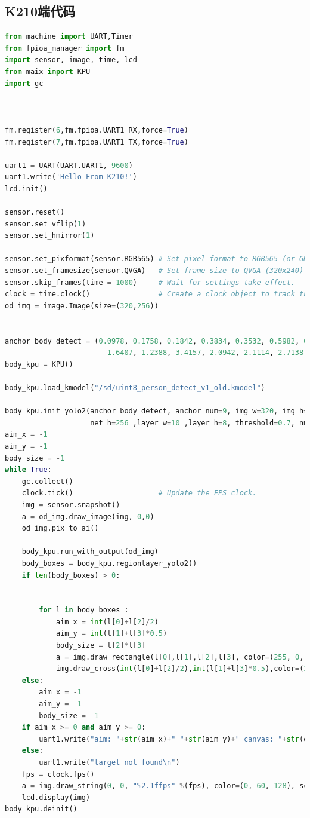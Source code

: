 \documentclass{article}
\begin{document}
\subsection{K210端代码}
\begin{lstlisting}[language=python,caption=main.py]
from machine import UART,Timer
from fpioa_manager import fm
import sensor, image, time, lcd
from maix import KPU
import gc



fm.register(6,fm.fpioa.UART1_RX,force=True)
fm.register(7,fm.fpioa.UART1_TX,force=True)

uart1 = UART(UART.UART1, 9600)
uart1.write('Hello From K210!')
lcd.init()

sensor.reset()
sensor.set_vflip(1)                 
sensor.set_hmirror(1)               

sensor.set_pixformat(sensor.RGB565) # Set pixel format to RGB565 (or GRAYSCALE)
sensor.set_framesize(sensor.QVGA)   # Set frame size to QVGA (320x240)
sensor.skip_frames(time = 1000)     # Wait for settings take effect.
clock = time.clock()                # Create a clock object to track the FPS.
od_img = image.Image(size=(320,256))


anchor_body_detect = (0.0978, 0.1758, 0.1842, 0.3834, 0.3532, 0.5982, 0.4855, 1.1146, 0.8869,
                        1.6407, 1.2388, 3.4157, 2.0942, 2.1114, 2.7138, 5.0008, 6.0293, 6.4540)
body_kpu = KPU()

body_kpu.load_kmodel("/sd/uint8_person_detect_v1_old.kmodel")

body_kpu.init_yolo2(anchor_body_detect, anchor_num=9, img_w=320, img_h=240, net_w=320 ,
                    net_h=256 ,layer_w=10 ,layer_h=8, threshold=0.7, nms_value=0.2, classes=1)
aim_x = -1
aim_y = -1
body_size = -1
while True:
    gc.collect()
    clock.tick()                    # Update the FPS clock.
    img = sensor.snapshot()
    a = od_img.draw_image(img, 0,0)
    od_img.pix_to_ai()

    body_kpu.run_with_output(od_img)
    body_boxes = body_kpu.regionlayer_yolo2()
    if len(body_boxes) > 0:


        for l in body_boxes :
            aim_x = int(l[0]+l[2]/2)
            aim_y = int(l[1]+l[3]*0.5)
            body_size = l[2]*l[3]
            a = img.draw_rectangle(l[0],l[1],l[2],l[3], color=(255, 0, 0),thickness=2)
            img.draw_cross(int(l[0]+l[2]/2),int(l[1]+l[3]*0.5),color=(255,255,255),size=10,thickhess=1)
    else:
        aim_x = -1
        aim_y = -1
        body_size = -1
    if aim_x >= 0 and aim_y >= 0:
        uart1.write("aim: "+str(aim_x)+" "+str(aim_y)+" canvas: "+str(od_img.width())+" "+str(od_img.height())+" size: "+ str(body_size)+'\n')
    else:
        uart1.write("target not found\n")
    fps = clock.fps()
    a = img.draw_string(0, 0, "%2.1ffps" %(fps), color=(0, 60, 128), scale=2.0)
    lcd.display(img)
body_kpu.deinit()
    
\end{lstlisting}
\end{document}
